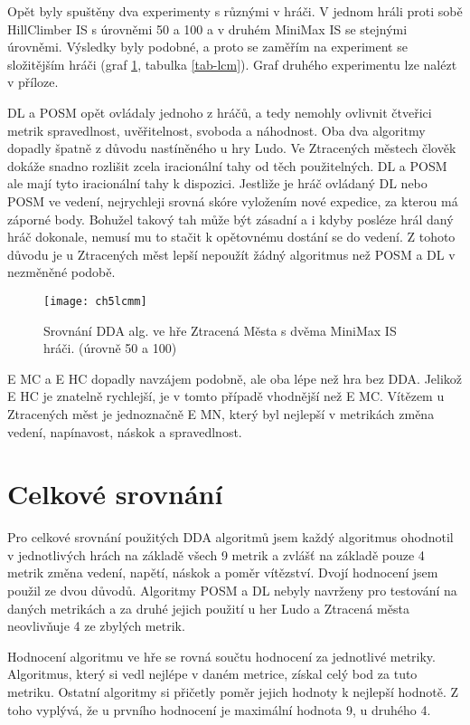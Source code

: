 Opět byly spuštěny dva experimenty s různými v hráči. V jednom hráli proti sobě HillClimber IS s úrovněmi 50 a 100 a v druhém MiniMax IS se stejnými úrovněmi. Výsledky byly podobné, a proto se zaměřím na experiment se složitějším hráči (graf \ref{fig-ch5lcmm}, tabulka \ref{tab-lcm}). Graf druhého experimentu lze nalézt v příloze.

DL a POSM opět ovládaly jednoho z hráčů, a tedy nemohly ovlivnit čtveřici metrik spravedlnost, uvěřitelnost, svoboda a náhodnost. Oba dva algoritmy dopadly špatně z důvodu nastíněného u hry Ludo. Ve Ztracených městech člověk dokáže snadno rozlišit zcela iracionální tahy od těch použitelných. DL a POSM ale mají tyto iracionální tahy k dispozici. Jestliže je hráč ovládaný DL nebo POSM ve vedení, nejrychleji srovná skóre vyložením nové expedice, za kterou má záporné body. Bohužel takový tah může být zásadní a i kdyby posléze hrál daný hráč dokonale, nemusí mu to stačit k opětovnému dostání se do vedení. Z tohoto důvodu je u Ztracených měst lepší nepoužít žádný algoritmus než POSM a DL v nezměněné podobě.

\begin{figure}
  \centering
  \texttt{[image: ch5lcmm]}
	\caption{Srovnání DDA alg. ve hře Ztracená Města s dvěma MiniMax IS hráči. (úrovně 50 a 100)}
	\label{fig-ch5lcmm}
\end{figure}

E MC a E HC dopadly navzájem podobně, ale oba lépe než hra bez DDA. Jelikož E HC je znatelně rychlejší, je v tomto případě vhodnější než E MC. Vítězem u Ztracených měst je jednoznačně E MN, který byl nejlepší v metrikách změna vedení, napínavost, náskok a spravedlnost.

\section{Celkové srovnání}

Pro celkové srovnání použitých DDA algoritmů jsem každý algoritmus ohodnotil v jednotlivých hrách na základě všech 9 metrik a zvlášť na základě pouze 4 metrik změna vedení, napětí, náskok a poměr vítězství. Dvojí hodnocení jsem použil ze dvou důvodů. Algoritmy POSM a DL nebyly navrženy pro testování na daných metrikách a za druhé jejich použití u her Ludo a Ztracená města neovlivňuje 4 ze zbylých metrik.

Hodnocení algoritmu ve hře se rovná součtu hodnocení za jednotlivé metriky. Algoritmus, který si vedl nejlépe v daném metrice, získal celý bod za tuto metriku. Ostatní algoritmy si přičetly poměr jejich hodnoty k nejlepší hodnotě. Z toho vyplývá, že u prvního hodnocení je maximální hodnota 9, u druhého 4.

